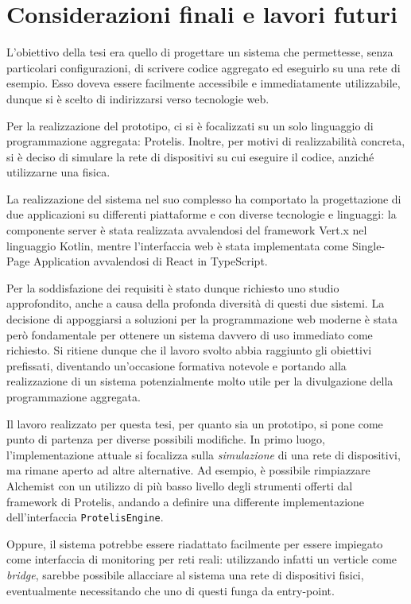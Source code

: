 \chapter{Considerazioni finali e lavori futuri}\label{ch:considerations}
  L'obiettivo della tesi era quello di progettare un sistema che permettesse, senza particolari configurazioni, di scrivere codice aggregato ed eseguirlo su una rete di esempio.
  Esso doveva essere facilmente accessibile e immediatamente utilizzabile, dunque si è scelto di indirizzarsi verso tecnologie web.

  Per la realizzazione del prototipo, ci si è focalizzati su un solo linguaggio di programmazione aggregata: Protelis.
  Inoltre, per motivi di realizzabilità concreta, si è deciso di simulare la rete di dispositivi su cui eseguire il codice, anziché utilizzarne una fisica.

  La realizzazione del sistema nel suo complesso ha comportato la progettazione di due applicazioni su differenti piattaforme e con diverse tecnologie e linguaggi:
  la componente server è stata realizzata avvalendosi del framework Vert.x nel linguaggio Kotlin,
  mentre l'interfaccia web è stata implementata come Single-Page Application avvalendosi di React in TypeScript.

  Per la soddisfazione dei requisiti è stato dunque richiesto uno studio approfondito, anche a causa della profonda diversità di questi due sistemi.
  La decisione di appoggiarsi a soluzioni per la programmazione web moderne è stata però fondamentale per ottenere un sistema davvero di uso immediato come richiesto.
  Si ritiene dunque che il lavoro svolto abbia raggiunto gli obiettivi prefissati, diventando un'occasione formativa notevole e portando alla realizzazione di un sistema potenzialmente molto utile per la divulgazione della programmazione aggregata.

  Il lavoro realizzato per questa tesi, per quanto sia un prototipo, si pone come punto di partenza per diverse possibili modifiche.
  In primo luogo, l'implementazione attuale si focalizza sulla \emph{simulazione} di una rete di dispositivi, ma rimane aperto ad altre alternative.
  Ad esempio, è possibile rimpiazzare Alchemist con un utilizzo di più basso livello degli strumenti offerti dal framework di Protelis, andando a definire una differente implementazione dell'interfaccia \texttt{ProtelisEngine}.

  Oppure, il sistema potrebbe essere riadattato facilmente per essere impiegato come interfaccia di monitoring per reti reali:
  utilizzando infatti un verticle come \emph{bridge}, sarebbe possibile allacciare al sistema una rete di dispositivi fisici, eventualmente necessitando che uno di questi funga da entry-point.


